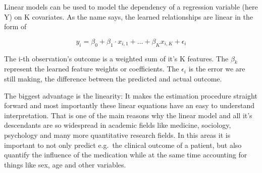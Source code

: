 \documentclass[12pt,]{krantz}
\theoremstyle{definition}
\theoremstyle{definition}
\theoremstyle{definition}
\theoremstyle{remark}
\begin{document}
Linear models can be used to model the dependency of a regression
variable (here Y) on K covariates. As the name says, the learned
relationships are linear in the form of

\[y_{i} = \beta_{0} + \beta_{1} \cdot x_{i,1} + \ldots + \beta_{K} x_{i,K} + \epsilon_{i}\]

The i-th observation's outcome is a weighted sum of it's K features. The
\(\beta_{k}\) represent the learned feature weights or coefficients. The
\(\epsilon_{i}\) is the error we are still making, the difference
between the predicted and actual outcome.

The biggest advantage is the linearity: It makes the estimation
procedure straight forward and most importantly these linear equations
have an easy to understand interpretation. That is one of the main
reasons why the linear model and all it's descendants are so widespread
in academic fields like medicine, sociology, psychology and many more
quantitative research fields. In this areas it is important to not only
predict e.g.~the clinical outcome of a patient, but also quantify the
influence of the medication while at the same time accounting for things
like sex, age and other variables.
\end{document}

